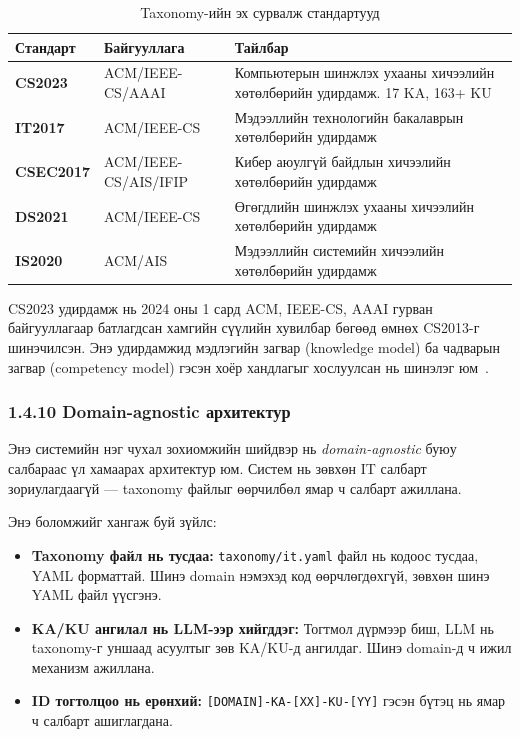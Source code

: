 \documentclass[12pt,A4]{report}
\newcommand{\eng}[1]{#1}
\newcommand{\term}[1]{\textit{#1}}
\begin{document}
\begin{table}[h!]
\centering
\caption{Taxonomy-ийн эх сурвалж стандартууд}
\label{tab:source_standards}
\begin{tabularx}{\textwidth}{>{\bfseries}l l X}
\toprule
\textbf{Стандарт} & \textbf{Байгууллага} & \textbf{Тайлбар} \\
\midrule
\rowcolor{lightbg}
CS2023 & ACM/IEEE-CS/AAAI & Компьютерын шинжлэх ухааны хичээлийн хөтөлбөрийн удирдамж. 17 KA, 163+ KU~\cite{cs2023} \\
IT2017 & ACM/IEEE-CS & Мэдээллийн технологийн бакалаврын хөтөлбөрийн удирдамж~\cite{it2017} \\
\rowcolor{lightbg}
CSEC2017 & ACM/IEEE-CS/AIS/IFIP & Кибер аюулгүй байдлын хичээлийн хөтөлбөрийн удирдамж~\cite{csec2017} \\
DS2021 & ACM/IEEE-CS & Өгөгдлийн шинжлэх ухааны хичээлийн хөтөлбөрийн удирдамж \\
\rowcolor{lightbg}
IS2020 & ACM/AIS & Мэдээллийн системийн хичээлийн хөтөлбөрийн удирдамж \\
\bottomrule
\end{tabularx}
\end{table}

CS2023 удирдамж нь 2024 оны 1 сард ACM, IEEE-CS, AAAI гурван байгууллагаар батлагдсан хамгийн сүүлийн хувилбар бөгөөд өмнөх CS2013-г шинэчилсэн. Энэ удирдамжид мэдлэгийн загвар (\eng{knowledge model}) ба чадварын загвар (\eng{competency model}) гэсэн хоёр хандлагыг хослуулсан нь шинэлэг юм~\cite{cs2023}.

\subsubsection{1.4.10 \eng{Domain-agnostic} архитектур}

Энэ системийн нэг чухал зохиомжийн шийдвэр нь \term{\eng{domain-agnostic}} буюу салбараас үл хамаарах архитектур юм. Систем нь зөвхөн IT салбарт зориулагдаагүй --- \eng{taxonomy} файлыг өөрчилбөл ямар ч салбарт ажиллана.

Энэ боломжийг хангаж буй зүйлс:

\begin{itemize}
    \item \textbf{\eng{Taxonomy} файл нь тусдаа:} \texttt{taxonomy/it.yaml} файл нь кодоос тусдаа, YAML форматтай. Шинэ \eng{domain} нэмэхэд код өөрчлөгдөхгүй, зөвхөн шинэ YAML файл үүсгэнэ.
    \item \textbf{KA/KU ангилал нь LLM-ээр хийгддэг:} Тогтмол дүрмээр биш, LLM нь \eng{taxonomy}-г уншаад асуултыг зөв KA/KU-д ангилдаг. Шинэ \eng{domain}-д ч ижил механизм ажиллана.
    \item \textbf{ID тогтолцоо нь ерөнхий:} \texttt{[DOMAIN]-KA-[XX]-KU-[YY]} гэсэн бүтэц нь ямар ч салбарт ашиглагдана.
\end{itemize}
\end{document}
